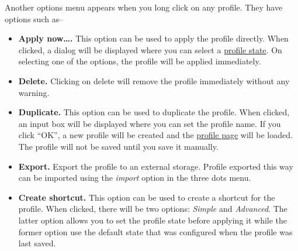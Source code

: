 Another options menu appears when you long click on any profile. They have options such as--
\begin{itemize}
    \item \textbf{Apply now\dots.} This option can be used to apply the profile directly. When clicked, a dialog will be
    displayed where you can select a \hyperref[subsubsec:profile-state]{profile state}. On selecting one of the options,
    the profile will be applied immediately.
    \item \textbf{Delete.} Clicking on delete will remove the profile immediately without any warning.
    \item \textbf{Duplicate.} This option can be used to duplicate the profile. When clicked, an input box will be
    displayed where you can set the profile name. If you click ``OK'', a new profile will be created and the
    \hyperref[sec:profile-page]{profile page} will be loaded. The profile will not be saved until you save it manually.
    \item \textbf{Export.} Export the profile to an external storage. Profile exported this way can be imported using
    the \textit{import} option in the three dots menu.
    \item \textbf{Create shortcut.} This option can be used to create a shortcut for the profile. When clicked, there
    will be two options: \textit{Simple} and \textit{Advanced}. The latter option allows you to set the profile state
    before applying it while the former option use the default state that was configured when the profile was last saved.
\end{itemize}
